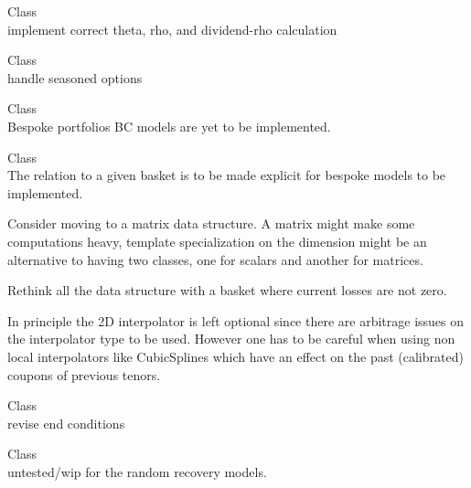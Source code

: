 \begin{DoxyRefList}
\item[Class \doxylink{class_quant_lib_1_1_analytic_discrete_geometric_average_price_asian_engine}{Quant\+Lib\+::Analytic\+Discrete\+Geometric\+Average\+Price\+Asian\+Engine} ]\hfill \\
\label{todo__todo000062}%
%
implement correct theta, rho, and dividend-\/rho calculation 
\item[Class \doxylink{class_quant_lib_1_1_analytic_discrete_geometric_average_price_asian_heston_engine}{Quant\+Lib\+::Analytic\+Discrete\+Geometric\+Average\+Price\+Asian\+Heston\+Engine} ]\hfill \\
\label{todo__todo000005}%
%
handle seasoned options  
\item[Class \doxylink{class_quant_lib_1_1_base_correlation_loss_model}{Quant\+Lib\+::Base\+Correlation\+Loss\+Model\texorpdfstring{$<$}{<} Base\+Model\+\_\+T, Corr2\+DInt\+\_\+T \texorpdfstring{$>$}{>}} ]\hfill \\
\label{todo__todo000008}%
%
Bespoke portfolios BC models are yet to be implemented. 
\item[Class \doxylink{class_quant_lib_1_1_base_correlation_term_structure}{Quant\+Lib\+::Base\+Correlation\+Term\+Structure\texorpdfstring{$<$}{<} Interpolator2\+D\+\_\+T \texorpdfstring{$>$}{>}} ]\hfill \\
\label{todo__todo000009}%
%
The relation to a given basket is to be made explicit for bespoke models to be implemented. 



Consider moving to a matrix data structure. A matrix might make some computations heavy, template specialization on the dimension might be an alternative to having two classes, one for scalars and another for matrices. 



Rethink all the data structure with a basket where current losses are not zero. 



In principle the 2D interpolator is left optional since there are arbitrage issues on the interpolator type to be used. However one has to be careful when using non local interpolators like Cubic\+Splines which have an effect on the past (calibrated) coupons of previous tenors.  
\item[Class \doxylink{class_quant_lib_1_1_bicubic_spline}{Quant\+Lib\+::Bicubic\+Spline} ]\hfill \\
\label{todo__todo000047}%
%
revise end conditions  
\item[Class \doxylink{class_quant_lib_1_1_binomial_loss_model}{Quant\+Lib\+::Binomial\+Loss\+Model\texorpdfstring{$<$}{<} LLM \texorpdfstring{$>$}{>}} ]\hfill \\
\label{todo__todo000010}%
%
untested/wip for the random recovery models. 




\end{DoxyRefList}

